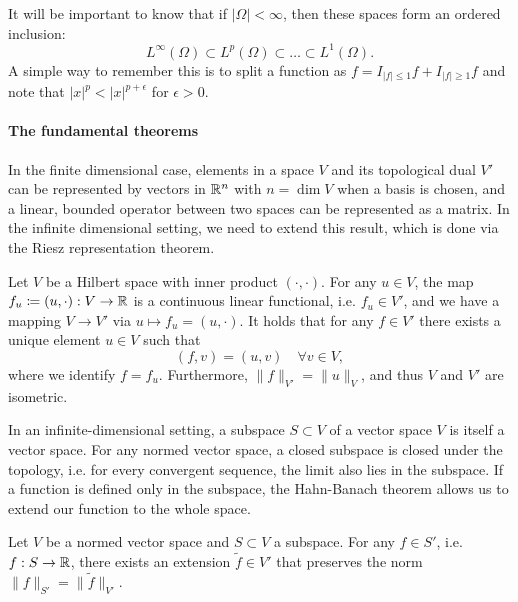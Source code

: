 It will be important to know that if $|\Omega|<\infty$, then these spaces form an ordered inclusion: 
\begin{equation}
    L^\infty(\Omega) \subset L^p(\Omega) \subset \dots \subset L^1(\Omega).
\end{equation}
A simple way to remember this is to split a function as $f = I_{|f|\leq 1}f + I_{|f|\geq 1}f$ and note that $|x|^p < |x|^{p+\epsilon}$ for $\epsilon > 0$. 

\paragraph{The fundamental theorems}
In the finite dimensional case, elements in a space $V$ and its topological dual $V'$ can be represented by vectors in $\mathbb{R}^n$ with $n=\dim V$ when a basis is chosen, and a linear, bounded operator between two spaces can be represented as a matrix. In the infinite dimensional setting, we need to extend this result, which is done via the Riesz representation theorem. 

\begin{theorem}\label{thm:riesz-representation}
    Let $V$ be a Hilbert space with inner product $(\cdot,\cdot)$. For any $u\in V$, the map $f_u\coloneqq (u,\cdot):V\to \mathbb{R}$ is a continuous linear functional, i.e. $f_u\in V'$, and we have a mapping $V\to V'$ via $u\mapsto f_u=(u,\cdot)$. It holds that for any $f\in V'$ there exists a unique element $u\in V$ such that 
    \begin{equation}
        (f,v) = (u,v)\quad \forall v\in V,
    \end{equation}
    where we identify $f=f_u$. Furthermore, $\|f\|_{V'} = \|u\|_V$, and thus $V$ and $V'$ are isometric.
\end{theorem}

In an infinite-dimensional setting, a subspace $S\subset V$ of a vector space $V$ is itself a vector space. For any normed vector space, a closed subspace is closed under the topology, i.e. for every convergent sequence, the limit also lies in the subspace. If a function is defined only in the subspace, the Hahn-Banach theorem allows us to extend our function to the whole space. 
\begin{theorem}\label{thm:hahn-banach}
    Let $V$ be a normed vector space and $S\subset V$ a subspace. For any $f\in S'$, i.e. $f:S\to\mathbb{R}$, there exists an extension $\tilde{f}\in V'$ that preserves the norm $\|f\|_{S'} = \|\tilde{f}\|_{V'}$.
\end{theorem}

